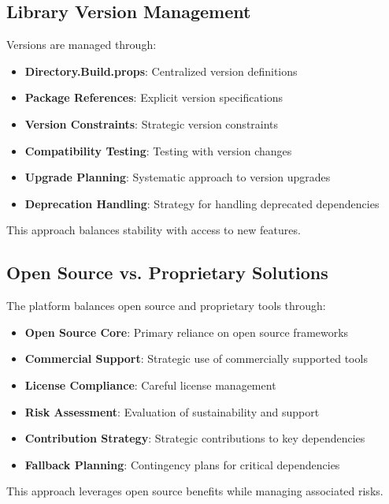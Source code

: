 \subsection{Library Version Management}
Versions are managed through:
\begin{itemize}
    \item \textbf{Directory.Build.props}: Centralized version definitions
    \item \textbf{Package References}: Explicit version specifications
    \item \textbf{Version Constraints}: Strategic version constraints
    \item \textbf{Compatibility Testing}: Testing with version changes
    \item \textbf{Upgrade Planning}: Systematic approach to version upgrades
    \item \textbf{Deprecation Handling}: Strategy for handling deprecated dependencies
\end{itemize}

This approach balances stability with access to new features.

\subsection{Open Source vs. Proprietary Solutions}
The platform balances open source and proprietary tools through:
\begin{itemize}
    \item \textbf{Open Source Core}: Primary reliance on open source frameworks
    \item \textbf{Commercial Support}: Strategic use of commercially supported tools
    \item \textbf{License Compliance}: Careful license management
    \item \textbf{Risk Assessment}: Evaluation of sustainability and support
    \item \textbf{Contribution Strategy}: Strategic contributions to key dependencies
    \item \textbf{Fallback Planning}: Contingency plans for critical dependencies
\end{itemize}

This approach leverages open source benefits while managing associated risks.

